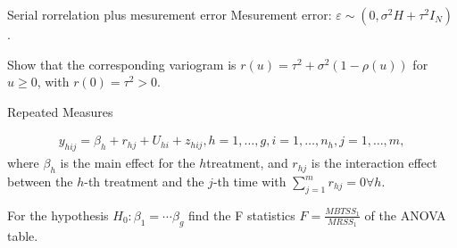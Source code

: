 \documentclass[UTF8,a4paper,10pt]{article}
\begin{document}
          
  \begin{Problem}[]{Serial rorrelation plus mesurement error}
    Mesurement error: \(\varepsilon \sim (0,\sigma^2 H+\tau^2I_N)\).

    Show that the corresponding variogram is \(r(u) = \tau^2+\sigma^2(1-\rho(u))\) for \(u\geq 0\), with \(r(0) = \tau^2>0\).

    
      \end{Problem} 


  \begin{Problem}[]{Repeated Measures}

    \begin{equation*}
      \begin{aligned}
        y_{hij} = \beta_{h}+r_{hj}+ U_{hi}+z_{hij}, h = 1,\ldots,g, i=1,\ldots,n_h, j=1,\ldots,m,
      \end{aligned}
    \end{equation*}
    where \(\beta_h\) is the main effect for the \(h\)\th treatment, and \(r_{hj}\) is the interaction effect between the \(h\)-th treatment and the \(j\)-th time with \(\sum_{j=1}^{m}r_{hj} = 0 \forall h\).

    For the hypothesis \(H_0:\beta_1 = \cdots\beta_g\)
find the F statistics \(F = \frac{MBTSS_1}{MRSS_1}\) of the ANOVA table.

    
      \end{Problem} 
\end{document}

